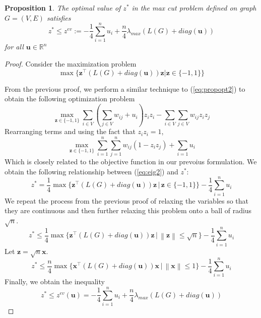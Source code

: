 \documentclass[12pt]{article}
\theoremstyle{plain}
\newtheorem{prop}{Proposition}
\theoremstyle{definition}
\newcommand{\norm}[1]{\left\lVert#1\right\rVert}
\begin{document}
\begin{prop}
    The optimal value of $z^*$ in the max cut problem defined on graph $G=(V,E)$ satisfies
    \[
        z^* \leq z^{ev} := - \frac{1}{4}\sum_{i=1}^n u_i + \dfrac{n}{4} \lambda_{max}(L(G) + diag(\mathbf{u}))
    \]
    for all $\mathbf{u} \in \mathbb{R}^n$
\end{prop}

\begin{proof}
    Consider the maximization problem
    \begin{equation}\label{eq:propopt2}
        \max\lbrace \mathbf{z}^\top (L(G) + diag(\mathbf{u})) \mathbf{z} | \mathbf{z} \in \lbrace -1,1\rbrace \rbrace
    \end{equation}
   
    From the previous proof, we perform a similar technique to (\ref{eq:propopt2}) to obtain the following optimization problem 
    \[
    \max_{\mathbf{z} \in \lbrace -1,1 \rbrace} \sum_{i \in V}\left(\sum_{j \in V} w_{ij} + u_i \right) z_i z_i - \sum_{i \in V}\sum_{j \in V} w_{ij}z_i z_j
    \] 
    Rearranging terms and using the fact that $z_i z_i = 1$,
    \begin{equation}
        \max_{\mathbf{z} \in \lbrace -1, 1\rbrace} \sum_{i = 1}^n \sum_{j=1}^n w_{ij} (1 - z_i z_j) + \sum_{i = 1} u_i \label{eq:eig2}
    \end{equation}
    Which is closely related to the objective function in our prevoius formulation. We obtain the following relationship between (\ref{eq:eig2}) and $z^*$:
    \[
      z^* = \frac{1}{4} \max\lbrace \mathbf{z}^\top (L(G) + diag(\mathbf{u})) \mathbf{z} \,|\, \mathbf{z} \in \lbrace -1,1\rbrace \rbrace - \frac{1}{4}\sum_{i=1}^n u_i   
    \]
    We repeat the process from the previous proof of relaxing the variables so that they are continuous and then further relaxing this problem onto a ball of radius $\sqrt{n}$.
    \[
        z^* \leq \frac{1}{4} \max\lbrace \mathbf{z}^\top (L(G) + diag(\mathbf{u})) \mathbf{z} \,|\, \norm{\mathbf{z}} \leq \sqrt{n} \rbrace - \frac{1}{4}\sum_{i=1}^n u_i
    \]
    Let $\mathbf{z} = \sqrt{n} \mathbf{x}$. 
    \[
        z^* \leq \frac{n}{4} \max\lbrace \mathbf{x}^\top (L(G) + diag(\mathbf{u})) \mathbf{x} \,|\, \norm{\mathbf{x}} \leq 1\rbrace - \frac{1}{4}\sum_{i=1}^n u_i
    \]
    Finally, we obtain the inequality
    \begin{equation}
        z^* \leq z^{ev}(\mathbf{u}) = -\frac{1}{4}\sum_{i=1}^n u_i + \dfrac{n}{4} \lambda_{max}(L(G) + diag(\mathbf{u}))
    \end{equation}
\end{proof}
    
\end{document}
